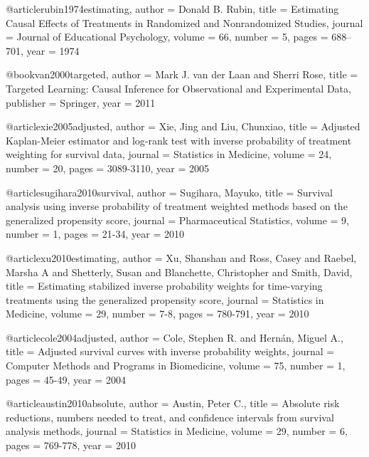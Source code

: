@article{rubin1974estimating,
  author = {Donald B. Rubin},
  title = {Estimating Causal Effects of Treatments in Randomized and Nonrandomized Studies},
  journal = {Journal of Educational Psychology},
  volume = {66},
  number = {5},
  pages = {688–701},
  year = {1974}
}



@book{van2000targeted,
  author = {Mark J. van der Laan and Sherri Rose},
  title = {Targeted Learning: Causal Inference for Observational and Experimental Data},
  publisher = {Springer},
  year = {2011}
}

















@article{xie2005adjusted,
  author = {Xie, Jing and Liu, Chunxiao},
  title = {Adjusted Kaplan-Meier estimator and log-rank test with inverse probability of treatment weighting for survival data},
  journal = {Statistics in Medicine},
  volume = {24},
  number = {20},
  pages = {3089-3110},
  year = {2005}
}

@article{sugihara2010survival,
  author = {Sugihara, Mayuko},
  title = {Survival analysis using inverse probability of treatment weighted methods based on the generalized propensity score},
  journal = {Pharmaceutical Statistics},
  volume = {9},
  number = {1},
  pages = {21-34},
  year = {2010}
}

@article{xu2010estimating,
  author = {Xu, Shanshan and Ross, Casey and Raebel, Marsha A and Shetterly, Susan and Blanchette, Christopher and Smith, David},
  title = {Estimating stabilized inverse probability weights for time-varying treatments using the generalized propensity score},
  journal = {Statistics in Medicine},
  volume = {29},
  number = {7-8},
  pages = {780-791},
  year = {2010}
}

@article{cole2004adjusted,
  author = {Cole, Stephen R. and Hernán, Miguel A.},
  title = {Adjusted survival curves with inverse probability weights},
  journal = {Computer Methods and Programs in Biomedicine},
  volume = {75},
  number = {1},
  pages = {45-49},
  year = {2004}
}

@article{austin2010absolute,
  author = {Austin, Peter C.},
  title = {Absolute risk reductions, numbers needed to treat, and confidence intervals from survival analysis methods},
  journal = {Statistics in Medicine},
  volume = {29},
  number = {6},
  pages = {769-778},
  year = {2010}
}

